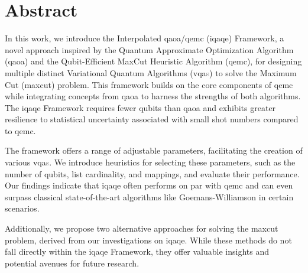 
\section*{Abstract}



In this work, we introduce the Interpolated \acrshort{qaoa}/\acrshort{qemc} (\acrshort{iqaqe}) Framework, a novel approach inspired by the Quantum Approximate Optimization Algorithm (\acrshort{qaoa}) and the Qubit-Efficient MaxCut Heuristic Algorithm (\acrshort{qemc}), for designing multiple distinct Variational Quantum Algorithms (\acrshort{vqa}\textcolor{gray}{s}) to solve the Maximum Cut (\acrshort{maxcut}) problem. This framework builds on the core components of \acrshort{qemc} while integrating concepts from \acrshort{qaoa} to harness the strengths of both algorithms. The \acrshort{iqaqe} Framework requires fewer qubits than \acrshort{qaoa} and exhibits greater resilience to statistical uncertainty associated with small shot numbers compared to \acrshort{qemc}.

The framework offers a range of adjustable parameters, facilitating the creation of various \acrshort{vqa}\textcolor{gray}{s}. We introduce heuristics for selecting these parameters, such as the number of qubits, list cardinality, and mappings, and evaluate their performance. Our findings indicate that \acrshort{iqaqe} often performs on par with \acrshort{qemc} and can even surpass classical state-of-the-art algorithms like Goemans-Williamson in certain scenarios.

Additionally, we propose two alternative approaches for solving the \acrshort{maxcut} problem, derived from our investigations on \acrshort{iqaqe}. While these methods do not fall directly within the \acrshort{iqaqe} Framework, they offer valuable insights and potential avenues for future research.

